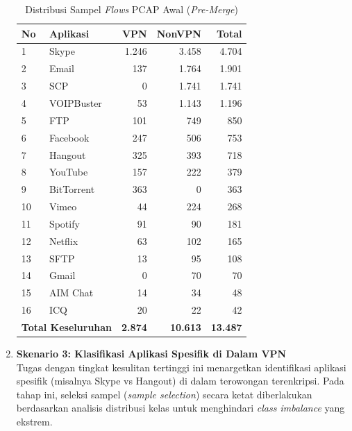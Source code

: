 \begin{enumerate}
\begin{table}[htbp]
    \centering
    \footnotesize
    \caption{Distribusi Sampel \textit{Flows} PCAP Awal (\textit{Pre-Merge})}
    \label{tab:distribusi_premerge}
    \captionsetup{font=small}
    \setlength{\tabcolsep}{2.5pt}
    \renewcommand{\arraystretch}{1.05}
    \begin{tabular}{@{}llrrr@{}}
        \toprule
        \textbf{No} & \textbf{Aplikasi} & \textbf{VPN} & \textbf{NonVPN} & \textbf{Total} \\
        \midrule
        1 & Skype & 1.246 & 3.458 & 4.704 \\
        2 & Email & 137 & 1.764 & 1.901 \\
        3 & SCP & 0 & 1.741 & 1.741 \\
        4 & VOIPBuster & 53 & 1.143 & 1.196 \\
        5 & FTP & 101 & 749 & 850 \\
        6 & Facebook & 247 & 506 & 753 \\
        7 & Hangout & 325 & 393 & 718 \\
        8 & YouTube & 157 & 222 & 379 \\
        9 & BitTorrent & 363 & 0 & 363 \\
        10 & Vimeo & 44 & 224 & 268 \\
        11 & Spotify & 91 & 90 & 181 \\
        12 & Netflix & 63 & 102 & 165 \\
        13 & SFTP & 13 & 95 & 108 \\
        14 & Gmail & 0 & 70 & 70 \\
        15 & AIM Chat & 14 & 34 & 48 \\
        16 & ICQ & 20 & 22 & 42 \\
        \midrule
        \multicolumn{2}{r}{\textbf{Total Keseluruhan}} & \textbf{2.874} & \textbf{10.613} & \textbf{13.487} \\
        \bottomrule
    \end{tabular}%
\end{table}

    \item \textbf{Skenario 3: Klasifikasi Aplikasi Spesifik di Dalam VPN} \\
    Tugas dengan tingkat kesulitan tertinggi ini menargetkan identifikasi aplikasi spesifik (misalnya Skype vs Hangout) di dalam terowongan terenkripsi. Pada tahap ini, seleksi sampel (\textit{sample selection}) secara ketat diberlakukan berdasarkan analisis distribusi kelas untuk menghindari \textit{class imbalance} yang ekstrem.
\end{enumerate}

